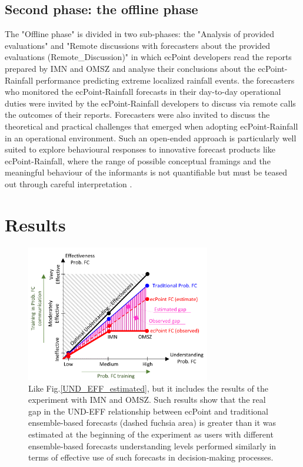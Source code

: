 \documentclass[twocol]{ametsocV5} %
\begin{document}
\subsection{Second phase: the offline phase}
The "Offline phase" is divided in two sub-phases: the "Analysis of provided evaluations" and "Remote discussions with forecasters about the provided evaluations (Remote\_Discussion)" in which ecPoint developers read the reports prepared by IMN and OMSZ and analyse their conclusions about the ecPoint-Rainfall performance predicting extreme localized rainfall events.  the forecasters who monitored the ecPoint-Rainfall forecasts in their day-to-day operational duties were invited by the ecPoint-Rainfall developers to discuss via remote calls the outcomes of their reports. Forecasters were also invited to discuss the theoretical and practical challenges that emerged when adopting ecPoint-Rainfall in an operational environment. Such an open-ended approach is particularly well suited to explore behavioural responses to innovative forecast products like ecPoint-Rainfall, where the range of possible conceptual framings and the meaningful behaviour of the informants is not quantifiable but must be teased out through careful interpretation \citep{Patton2002}.	


\section{Results}

\begin{figure}
\centerline{\includegraphics[width=19pc]{manuscript/Figures/ProbFC_Knowledge_Effectiveness_Observed.png}}
\caption{Like Fig.\ref{UND_EFF_estimated}, but it includes the results of the experiment with IMN and OMSZ. Such results show that the real gap in the UND-EFF relationship between ecPoint and traditional ensemble-based forecasts (dashed fuchsia area) is greater than it was estimated at the beginning of the experiment as users with different ensemble-based forecasts understanding levels performed similarly in terms of effective use of such forecasts in decision-making processes.}
\label{UND_EFF_observed}
\end{figure}
\end{document}
